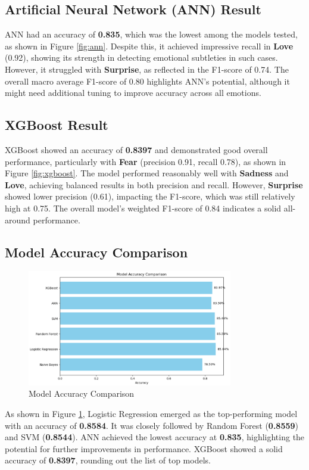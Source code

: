 \subsection{Artificial Neural Network (ANN) Result}
ANN had an accuracy of \textbf{0.835}, which was the lowest among the models tested, as shown in Figure \ref{fig:ann}. Despite this, it achieved impressive recall in \textbf{Love} (0.92), showing its strength in detecting emotional subtleties in such cases. However, it struggled with \textbf{Surprise}, as reflected in the F1-score of 0.74. The overall macro average F1-score of 0.80 highlights ANN's potential, although it might need additional tuning to improve accuracy across all emotions.

\subsection{XGBoost Result}
XGBoost showed an accuracy of \textbf{0.8397} and demonstrated good overall performance, particularly with \textbf{Fear} (precision 0.91, recall 0.78), as shown in Figure \ref{fig:xgboost}. The model performed reasonably well with \textbf{Sadness} and \textbf{Love}, achieving balanced results in both precision and recall. However, \textbf{Surprise} showed lower precision (0.61), impacting the F1-score, which was still relatively high at 0.75. The overall model's weighted F1-score of 0.84 indicates a solid all-around performance.

\subsection{Model Accuracy Comparison}
\begin{figure}[h!]
\centering
\includegraphics[width=0.8\textwidth]{model_accuracy.png}
\caption{Model Accuracy Comparison}
\label{fig:model_accuracy}
\end{figure}
As shown in Figure \ref{fig:model_accuracy}, Logistic Regression emerged as the top-performing model with an accuracy of \textbf{0.8584}. It was closely followed by Random Forest (\textbf{0.8559}) and SVM (\textbf{0.8544}). ANN achieved the lowest accuracy at \textbf{0.835}, highlighting the potential for further improvements in performance. XGBoost showed a solid accuracy of \textbf{0.8397}, rounding out the list of top models.

